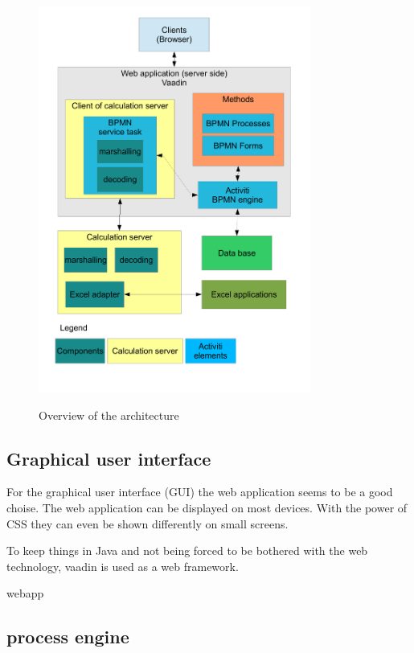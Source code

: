 \documentclass[paper=a4,twoside=false,BCOR=0mm,DIV=calc,fontsize=12pt]{scrartcl}
\begin{document}
\begin{figure}
    \begin{center}
      \includegraphics[width=0.8\textwidth]{./img/ArchitectrueOverview.pdf}\\
    \end{center}
  \caption{Overview of the architecture}
  \label{architectureoverview}
\end{figure} 

\subsection{Graphical user interface}
For the graphical user interface (GUI) the web application seems to be a good choise. The web application can be displayed on most devices. With the power of CSS \cite{css} they can even be shown differently on small screens.

To keep things in Java and not being forced to be bothered with the web technology, vaadin \cite{vaadin} is used as a web framework.

webapp

\subsection{process engine}
\end{document}
